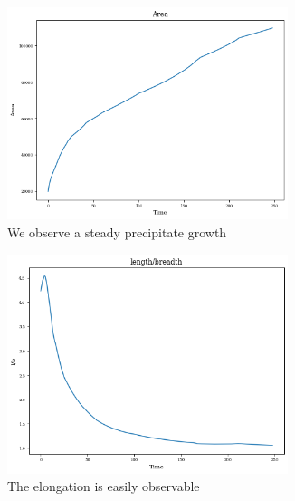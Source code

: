 \documentclass[12pt, a4paper]{report}
\begin{document}
\begin{figure}[H]
\centering
\begin{subfigure}{.45\textwidth}
  \centering
  \includegraphics[width=0.9\textwidth]{Pictures/Results/3area.jpeg}
  \caption{We observe a steady precipitate growth}
  \label{img:microstrImg}
\end{subfigure}
\begin{subfigure}{.45\textwidth}
  \centering
  \includegraphics[width=0.9\textwidth]{Pictures/Results/3lb.jpeg}
  \caption{The elongation is easily observable}
  \label{img:microstrImg}
\end{subfigure}
\begin{subfigure}{.45\textwidth}
  \centering

\end{subfigure}
\end{figure}
\end{document}
